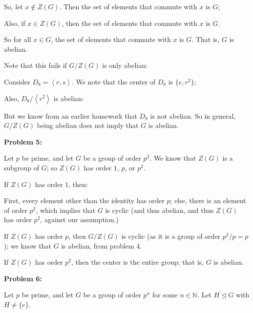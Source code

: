 \documentclass[a4paper,12pt]{article}
\newcommand{\tab}{\hspace{4mm}} %
\newcommand{\shunt}{\vspace{20mm}}
\newcommand{\anbrack}[1]{\left\langle #1 \right\rangle}
\newcommand{\N}{\mathbb{N}}
\newcommand{\subgp}{\mathrel{\unlhd}}
\begin{document}
So, let $x \notin Z(G)$. Then the set of elements that commute with $x$ is $G$; %

Also, if $x \in Z(G)$, then the set of elements that commute with $x$ is $G$.

So for all $x \in G$, the set of elements that commute with $x$ is $G$. That is, $G$ is abelian.

Note that this fails if $G/Z(G)$ is only abelian:

\tab Consider $D_8=\anbrack{r,s}$. We note that the center of $D_8$ is $\{e,r^2\}$;

\tab \tab %

\tab Also, $D_8/\anbrack{r^2}$ is abelian:

\tab \tab %

\tab But we know from an earlier homework that $D_8$ is not abelian. So in general, $G/Z(G)$ being abelian does not imply that $G$ is abelian.

\shunt

{\bf Problem 5:}

Let $p$ be prime, and let $G$ be a group of order $p^2$. We know that $Z(G)$ is a subgroup of $G$; so $Z(G)$ has order $1$, $p$, or $p^2$.

If $Z(G)$ has order $1$, then:

\tab First, every element other than the identity has order $p$; else, there is an element of order $p^2$, which implies that $G$ is cyclic (and thus abelian, and thus $Z(G)$ has order $p^2$, against our assumption.)

\tab %

If $Z(G)$ has order $p$, then $G/Z(G)$ is cyclic (as it is a group of order $p^2/p = p$); we know that $G$ is abelian, from problem 4. 

If $Z(G)$ has order $p^2$, then the center is the entire group; that is, $G$ is abelian.

\shunt

{\bf Problem 6:}

Let $p$ be prime, and let $G$ be a group of order $p^n$ for some $n \in \N$. Let $H \subgp G$ with $H \neq \{e\}$.

\shunt
\end{document}
